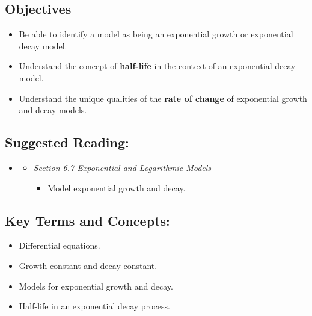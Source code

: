 
\vspace{-0.25 in}
\begin{framed}
\subsection*{Objectives}
\begin{itemize}
    \item Be able to identify a model as being an exponential growth or exponential decay model.
    \item Understand the concept of \textbf{half-life} in the context of an exponential decay model.  
    \item Understand the unique qualities of the \textbf{rate of change} of exponential growth and decay models.
\end{itemize}

\subsection*{Suggested Reading:}
\begin{itemize}
\item \cite{openstaxColAlgebra}\footnotemark[1]
    \begin{itemize}
        \item \emph{Section 6.7 Exponential and Logarithmic Models}
        \begin{itemize}
            \item Model exponential growth and decay.
        \end{itemize}
    \end{itemize}
   
\end{itemize}
\subsection*{Key Terms and Concepts:} 

\begin{itemize}
    \item Differential equations.
    \item Growth constant and decay constant.
    \item Models for exponential growth and decay.
    \item Half-life in an exponential decay process.
\end{itemize}
\end{framed}

